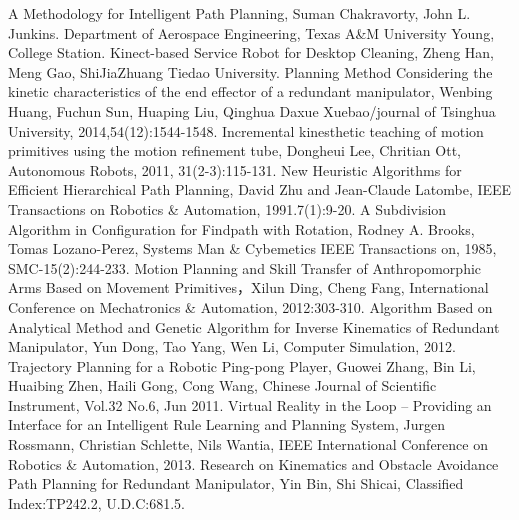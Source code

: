 \documentclass[letterpaper, 10 pt, conference]{ieeeconf}  %
\begin{document}












\begin{thebibliography}{99}

 A Methodology for Intelligent Path Planning, Suman Chakravorty, John L. Junkins. Department of Aerospace Engineering, Texas A\&M University Young, College Station.
 Kinect-based Service Robot for Desktop Cleaning, Zheng Han, Meng Gao, ShiJiaZhuang Tiedao University.
 Planning Method Considering the kinetic characteristics of the end effector of a redundant manipulator, Wenbing Huang, Fuchun Sun, Huaping Liu, Qinghua Daxue Xuebao/journal of Tsinghua University, 2014,54(12):1544-1548.
 Incremental kinesthetic teaching of motion primitives using the motion refinement tube, Dongheui Lee, Chritian Ott, Autonomous Robots, 2011, 31(2-3):115-131.
 New Heuristic Algorithms for Efficient Hierarchical Path Planning,  David Zhu and Jean-Claude Latombe, IEEE Transactions on Robotics \& Automation, 1991.7(1):9-20.
 A Subdivision Algorithm in Configuration for Findpath with Rotation, Rodney A. Brooks, Tomas Lozano-Perez, Systems Man \& Cybemetics IEEE Transactions on, 1985, SMC-15(2):244-233.
 Motion Planning and Skill Transfer of Anthropomorphic Arms Based on Movement Primitives，Xilun Ding, Cheng Fang, International Conference on Mechatronics \& Automation, 2012:303-310.
 Algorithm Based on Analytical Method and Genetic Algorithm for Inverse Kinematics of Redundant Manipulator, Yun Dong, Tao Yang, Wen Li, Computer Simulation, 2012.
 Trajectory Planning for a Robotic Ping-pong Player, Guowei Zhang, Bin Li, Huaibing Zhen, Haili Gong, Cong Wang, Chinese Journal of Scientific Instrument, Vol.32 No.6, Jun 2011.
 Virtual Reality in the Loop – Providing an Interface for an Intelligent Rule Learning and Planning System, Jurgen Rossmann, Christian Schlette, Nils Wantia, IEEE International Conference on Robotics \& Automation, 2013.
 Research on Kinematics and Obstacle Avoidance Path Planning for Redundant Manipulator, Yin Bin, Shi Shicai, Classified Index:TP242.2, U.D.C:681.5.






\end{thebibliography}
\end{document}
